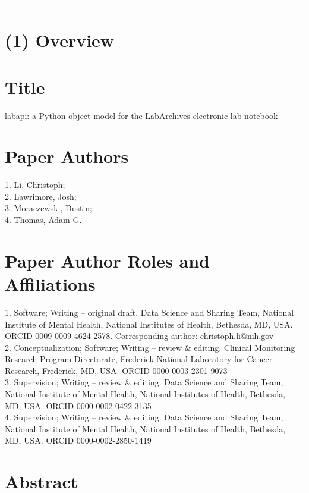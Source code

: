 \documentclass{jors}
\begin{document}
\rule{\textwidth}{1pt}

\section*{(1) Overview}

\vspace{0.5cm}

\section*{Title}

labapi: a Python object model for the LabArchives electronic lab notebook

\section*{Paper Authors}

1. Li, Christoph; \\
2. Lawrimore, Josh; \\
3. Moraczewski, Dustin; \\
4. Thomas, Adam G.

\section*{Paper Author Roles and Affiliations}

1. Software; Writing -- original draft. Data Science and Sharing Team,
National Institute of Mental Health, National Institutes of Health,
Bethesda, MD, USA. ORCID 0009-0009-4624-2578. Corresponding author:
christoph.li@nih.gov \\
2. Conceptualization; Software; Writing -- review \& editing. Clinical
Monitoring Research Program Directorate, Frederick National Laboratory for
Cancer Research, Frederick, MD, USA. ORCID 0000-0003-2301-9073 \\
3. Supervision; Writing -- review \& editing. Data Science and Sharing Team,
National Institute of Mental Health, National Institutes of Health,
Bethesda, MD, USA. ORCID 0000-0002-0422-3135 \\
4. Supervision; Writing -- review \& editing. Data Science and Sharing Team,
National Institute of Mental Health, National Institutes of Health,
Bethesda, MD, USA. ORCID 0000-0002-2850-1419

\section*{Abstract}
\end{document}

